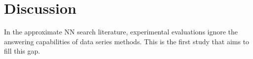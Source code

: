 {\color{black}
\section{Discussion}
\label{sec:discussion}

In the approximate NN search literature, experimental evaluations ignore the %
answering capabilities of data series methods. %
This is the first %
study that aims to fill %
this gap. %

}
